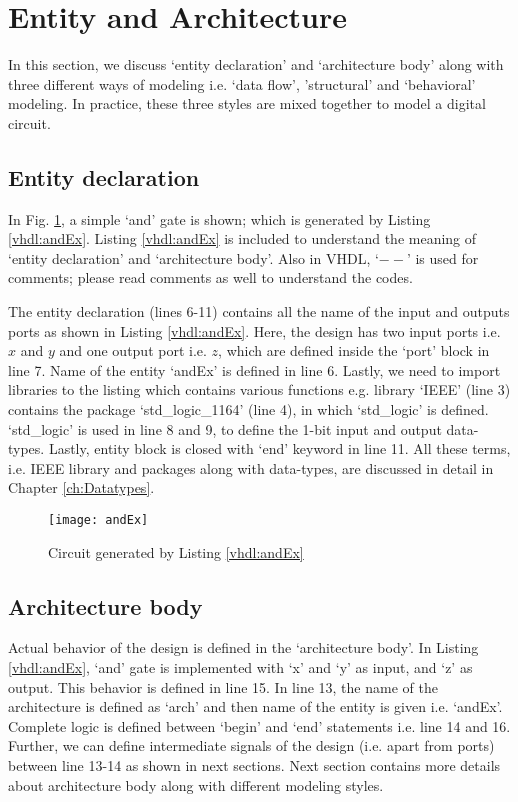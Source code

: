 \section{Entity and Architecture}
In this section, we discuss `entity declaration' and `architecture body' along with three different ways of modeling i.e. `data flow', 'structural' and `behavioral' modeling. In practice, these three styles are mixed together to model a digital circuit.  

\subsection{Entity declaration}
In Fig. \ref{fig:andEx}, a simple `and' gate is shown; which is generated by Listing \ref{vhdl:andEx}. Listing \ref{vhdl:andEx} is included to understand the meaning of `entity declaration' and `architecture body'. Also in VHDL, `$--$' is used for comments; please read comments as well to understand the codes.

The entity declaration (lines 6-11) contains all the name of the input and outputs ports as shown in Listing \ref{vhdl:andEx}. Here, the design has two input ports i.e. $x$ and $y$ and one output port i.e. $z$, which are defined inside the `port' block in line 7. Name of the entity `andEx' is defined in line 6. Lastly, we need to import libraries to the listing which contains various functions e.g. library `IEEE' (line 3) contains the package `std\_logic\_1164' (line 4), in which `std\_logic' is defined. `std\_logic' is used in line 8 and 9, to define the 1-bit input and output data-types. Lastly, entity block is closed with `end' keyword in line 11. All these terms, i.e. IEEE library and packages along with data-types, are discussed in detail in Chapter \ref{ch:Datatypes}.  

\begin{figure}
	\centering
	\texttt{[image: andEx]}
	\caption{Circuit generated by Listing \ref{vhdl:andEx}}
	\label{fig:andEx}
\end{figure}



\subsection{Architecture body}
Actual behavior of the design is defined in  the `architecture body'. In Listing \ref{vhdl:andEx}, `and' gate is implemented with `x' and `y' as input, and `z' as output. This behavior is defined in line 15. In line 13, the name of the architecture is defined as `arch' and then name of the entity is given i.e. `andEx'. Complete logic is defined between `begin' and `end' statements i.e. line 14 and 16. Further, we can define intermediate signals of the design (i.e. apart from ports) between line 13-14 as shown in next sections. Next section contains more details about architecture body along with different modeling styles. 

